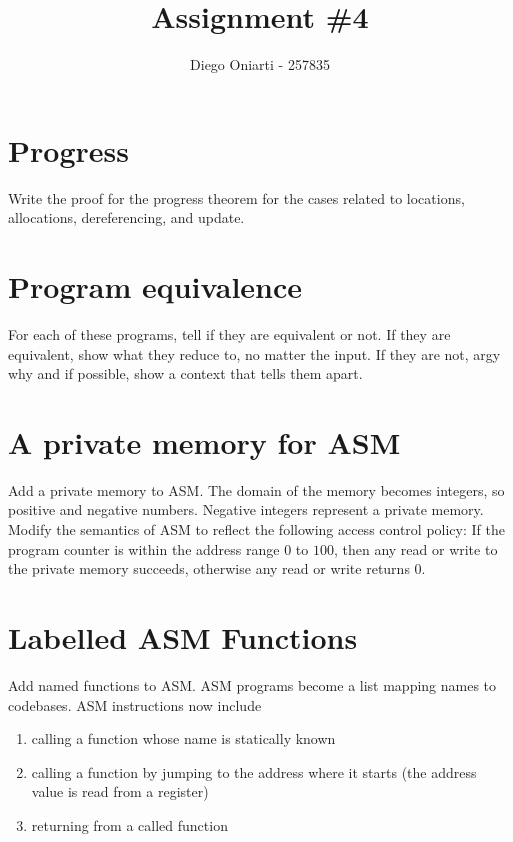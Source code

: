 \documentclass{article}
\title{Assignment \#4}
\author{Diego Oniarti - 257835}
\date{}
\begin{document}
\maketitle

\section{Progress}
Write the proof for the progress theorem for the cases related to locations, allocations, dereferencing, and update.

\section{Program equivalence}
For each of these programs, tell if they are equivalent or not. If they are equivalent, show what they reduce to, no matter the input. If they are not, argy why and if possible, show a context that tells them apart.

\section{A private memory for ASM}
Add a private memory to ASM. The domain of the memory becomes integers, so positive and negative numbers. Negative integers represent a private memory. \\
Modify the semantics of ASM to reflect the following access control policy:
If the program counter is within the address range $0$ to $100$, then any read or write to the private memory succeeds, otherwise any read or write returns $0$.

\section{Labelled ASM Functions}
Add named functions to ASM. ASM programs become a list mapping names to codebases. ASM instructions now include
\begin{enumerate}
    \item calling a function whose name is statically known
    \item calling a function by jumping to the address where it starts (the address value is read from a register)
    \item returning from a called function
\end{enumerate}
\end{document}
